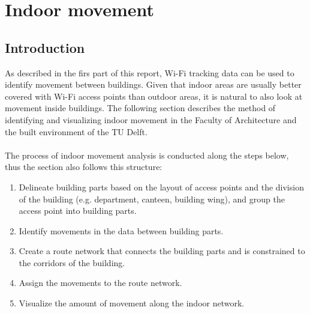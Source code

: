 \chapter{Indoor movement}\label{indoormovement}
\section{Introduction}
As described in the firs part of this report, Wi-Fi tracking data can be used to identify movement between buildings. Given that indoor areas are usually better
covered with Wi-Fi access points than outdoor areas, it is natural to also look at movement inside buildings. The following section describes the method of
identifying and visualizing indoor movement in the Faculty of Architecture and the built environment of the TU Delft.\\\\
The process of indoor movement analysis is conducted along the steps below, thus the section also follows this structure:

\begin{enumerate}
    \item Delineate building parts based on the layout of access points and the division of the building (e.g. department, canteen, building wing), and
group the access point into building parts.
    \item Identify movements in the data between building parts.
    \item Create a route network that connects the building parts and is constrained to the corridors of the building.
    \item Assign the movements to the route network.
    \item Visualize the amount of movement along the indoor network.
\end{enumerate}

